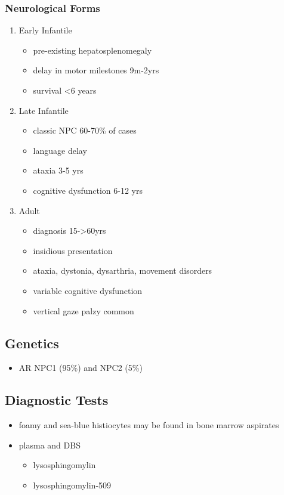 \documentclass[12pt]{scrartcl}
\begin{document}
\subsubsection{Neurological Forms}
\label{sec:org31f0e29}
\begin{enumerate}
\item Early Infantile
\label{sec:org8cd1377}
\begin{itemize}
\item pre-existing hepatosplenomegaly
\item delay in motor milestones 9m-2yrs
\item survival <6 years
\end{itemize}

\item Late Infantile
\label{sec:org764fa1a}
\begin{itemize}
\item classic NPC 60-70\% of cases
\item language delay
\item ataxia 3-5 yrs
\item cognitive dysfunction 6-12 yrs
\end{itemize}

\item Adult
\label{sec:org34fb4b3}
\begin{itemize}
\item diagnosis 15->60yrs
\item insidious presentation
\item ataxia, dystonia, dysarthria, movement disorders
\item variable cognitive dysfunction
\item vertical gaze palzy common
\end{itemize}
\end{enumerate}

\subsection{Genetics}
\label{sec:org1284fba}
\begin{itemize}
\item AR NPC1 (95\%) and NPC2 (5\%)
\end{itemize}
\subsection{Diagnostic Tests}
\label{sec:org583823b}
\begin{itemize}
\item foamy and sea-blue histiocytes may be found in bone marrow aspirates
\item plasma and DBS
\begin{itemize}
\item lysosphingomylin
\item lysosphingomylin-509
\end{itemize}
\end{itemize}
\end{document}
